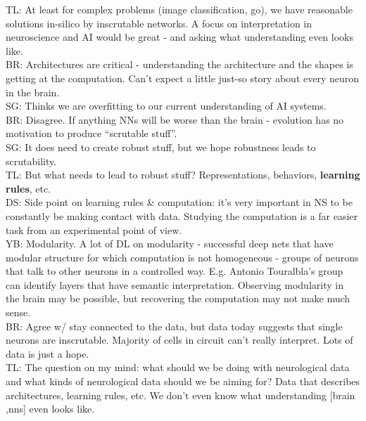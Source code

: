 \documentclass[12pt]{article}
\begin{document}
TL: At least for complex problems (image classification, go), we have reasonable solutions in-silico by inscrutable networks. A focus on interpretation in neuroscience and AI would be great - and asking what understanding even looks like. \\

BR: Architectures are critical - understanding the architecture and the shapes is getting at the computation. Can't expect a little just-so story about every neuron in the brain. \\

SG: Thinks we are overfitting to our current understanding of AI systems. \\

BR: Disagree. If anything NNs will be worse than the brain - evolution has no motivation to produce ``scrutable stuff''. \\

SG: It does need to create robust stuff, but we hope robustness leads to scrutability. \\

TL: But what needs to lead to robust stuff? Representations, behaviors, \textbf{learning rules}, etc. \\

DS: Side point on learning rules \& computation: it's very important in NS to be constantly be making contact with data. Studying the computation is a far easier task from an experimental point of view. \\

YB: Modularity. A lot of DL on modularity - successful deep nets that have modular structure for which computation is not homogeneous - groups of neurons that talk to other neurons in a controlled way. E.g. Antonio Touralbla's group can identify layers that have semantic interpretation. Observing modularity in the brain may be possible, but recovering the computation may not make much sense. \\

BR: Agree w/ stay connected to the data, but data today suggests that single neurons are inscrutable. Majority of cells in circuit can't really interpret. Lots of data is just a hope. \\

TL: The question on my mind: what should we be doing with neurological data and what kinds of neurological data should we be aiming for? Data that describes architectures, learning rules, etc. We don't even know what understanding [brain ,nns] even looks like. \\
\end{document}
